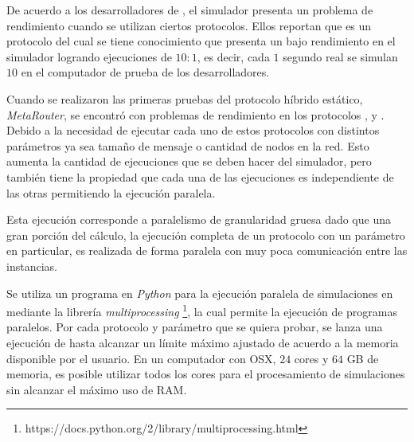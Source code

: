 De acuerdo a los desarrolladores de \theone{} \cite{keranen_one_2009}, el
simulador presenta un problema de rendimiento cuando se utilizan ciertos
protocolos. Ellos reportan que \maxprop{} es un protocolo del cual se tiene
conocimiento que presenta un bajo rendimiento en el simulador logrando
ejecuciones de $10:1$, es decir, cada $1$ segundo real se simulan $10$ en el
computador de prueba de los desarrolladores. 



Cuando se realizaron las primeras pruebas del protocolo híbrido estático,
\textit{MetaRouter}, se encontró con problemas de rendimiento en los protocolos
\maxprop, \epidemic{} y \prophet. Debido a la necesidad de ejecutar cada uno de
estos protocolos con distintos parámetros ya sea tamaño de mensaje o cantidad de
nodos en la red. Esto aumenta la cantidad de ejecuciones que se deben hacer del
simulador, pero también tiene la propiedad que cada una de las ejecuciones es
independiente de las otras permitiendo la ejecución paralela.

Esta ejecución corresponde a paralelismo de granularidad gruesa dado que una
gran porción del cálculo, la ejecución completa de un protocolo con un parámetro
en particular, es realizada de forma paralela con muy poca comunicación entre
las instancias.


Se utiliza un programa en \textit{Python} para la ejecución paralela de
simulaciones en \theone{} mediante la librería \textit{multiprocessing}
\footnote{https://docs.python.org/2/library/multiprocessing.html}, la cual
permite la ejecución de programas paralelos. Por cada protocolo y parámetro que
se quiera probar, se lanza una ejecución de \theone{} hasta alcanzar un límite
máximo ajustado de acuerdo a la memoria disponible por el usuario. En un
computador con OSX, $24$ cores y $64$ GB de memoria, es posible utilizar todos
los cores para el procesamiento de simulaciones sin alcanzar el máximo uso de
RAM.






